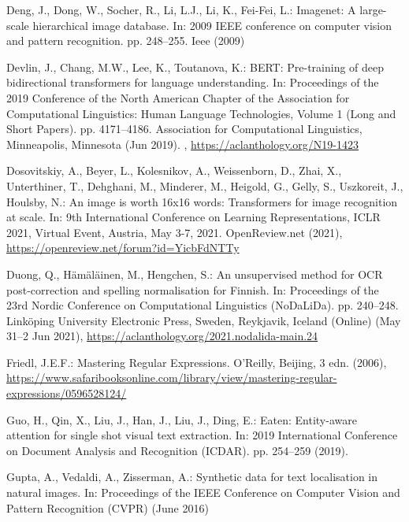 \documentclass[runningheads]{llncs}
\begin{document}
\begin{thebibliography}{10}
Deng, J., Dong, W., Socher, R., Li, L.J., Li, K., Fei-Fei, L.: Imagenet: A
  large-scale hierarchical image database. In: 2009 IEEE conference on computer
  vision and pattern recognition. pp. 248--255. Ieee (2009)

Devlin, J., Chang, M.W., Lee, K., Toutanova, K.: {BERT}: Pre-training of deep
  bidirectional transformers for language understanding. In: Proceedings of the
  2019 Conference of the North {A}merican Chapter of the Association for
  Computational Linguistics: Human Language Technologies, Volume 1 (Long and
  Short Papers). pp. 4171--4186. Association for Computational Linguistics,
  Minneapolis, Minnesota (Jun 2019). ,
  \url{https://aclanthology.org/N19-1423}

Dosovitskiy, A., Beyer, L., Kolesnikov, A., Weissenborn, D., Zhai, X.,
  Unterthiner, T., Dehghani, M., Minderer, M., Heigold, G., Gelly, S.,
  Uszkoreit, J., Houlsby, N.: An image is worth 16x16 words: Transformers for
  image recognition at scale. In: 9th International Conference on Learning
  Representations, {ICLR} 2021, Virtual Event, Austria, May 3-7, 2021.
  OpenReview.net (2021), \url{https://openreview.net/forum?id=YicbFdNTTy}

Duong, Q., H{\"a}m{\"a}l{\"a}inen, M., Hengchen, S.: An unsupervised method for
  {OCR} post-correction and spelling normalisation for {F}innish. In:
  Proceedings of the 23rd Nordic Conference on Computational Linguistics
  (NoDaLiDa). pp. 240--248. Link{\"o}ping University Electronic Press, Sweden,
  Reykjavik, Iceland (Online) (May 31--2 Jun 2021),
  \url{https://aclanthology.org/2021.nodalida-main.24}

Friedl, J.E.F.: Mastering Regular Expressions. O'Reilly, Beijing, 3 edn.
  (2006),
  \url{https://www.safaribooksonline.com/library/view/mastering-regular-expressions/0596528124/}

Guo, H., Qin, X., Liu, J., Han, J., Liu, J., Ding, E.: Eaten: Entity-aware
  attention for single shot visual text extraction. In: 2019 International
  Conference on Document Analysis and Recognition (ICDAR). pp. 254--259 (2019).

Gupta, A., Vedaldi, A., Zisserman, A.: Synthetic data for text localisation in
  natural images. In: Proceedings of the IEEE Conference on Computer Vision and
  Pattern Recognition (CVPR) (June 2016)


\end{thebibliography}
\end{document}
